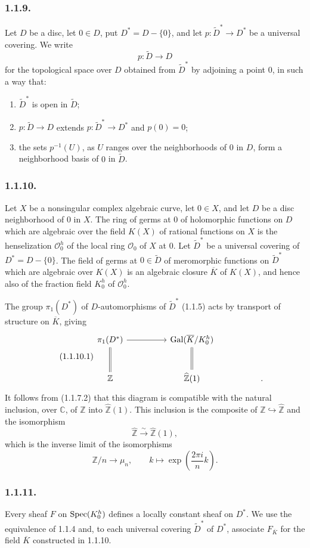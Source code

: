 \subsubsection*{1.1.9.}
Let $D$ be a disc, let $0\in D$, put $D^*=D-\{0\}$, and let
$p:\widetilde D^*\longrightarrow D^*$ be a universal covering.  We
write
\[
p:\widetilde D\longrightarrow D
\]
for the topological space over $D$ obtained from
$\widetilde D^*$ by adjoining a point $0$, in such a way that:
\begin{enumerate}[label=(\alph*),leftmargin=2.6em]
\item $\widetilde D^*$ is open in $\widetilde D$;
\item $p:\widetilde D\longrightarrow D$ extends
  $p:\widetilde D^*\longrightarrow D^*$ and $p(0)=0$;
\item the sets $p^{-1}(U)$, as $U$ ranges over the neighborhoods of
  $0$ in $D$, form a neighborhood basis of $0$ in $\widetilde D$.
\end{enumerate}

\subsubsection*{1.1.10.}
Let $X$ be a nonsingular complex algebraic curve, let $0\in X$, and
let $D$ be a disc neighborhood of $0$ in $X$.  The ring of germs at
$0$ of holomorphic functions on $D$ which are algebraic over the
field $K(X)$ of rational functions on $X$ is the henselization
$\mathcal O_0^h$ of the local ring $\mathcal O_0$ of $X$ at $0$.
Let $\widetilde D^*$ be a universal covering of
$D^*=D-\{0\}$.  The field of germs at $0\in\widetilde D$ of
meromorphic functions on $\widetilde D^*$ which are algebraic over
$K(X)$ is an algebraic closure $\overline K$ of $K(X)$, and hence
also of the fraction field $K_0^h$ of $\mathcal O_0^h$.

The group $\pi_1(D^*)$ of $D$-automorphisms of
$\widetilde D^*$ (1.1.5) acts by transport of structure on
$\overline K$, giving
\begin{equation}\tag{1.1.10.1}
\begin{tikzcd}[column sep=huge, row sep=large]
\pi_1(D^*) \arrow[r] \arrow[d, equal]
  & \operatorname{Gal}(\overline K/K_0^h) \arrow[d, equal]
  & {} \\
\mathbb Z
  & \widehat{\mathbb Z}(1)
  & .
\end{tikzcd}
\end{equation}
It follows from (1.1.7.2) that this diagram is compatible with the
natural inclusion, over $\mathbb C$, of $\mathbb Z$ into
$\widehat{\mathbb Z}(1)$.  This inclusion is the composite of
$\mathbb Z\hookrightarrow\widehat{\mathbb Z}$ and the isomorphism
\[
\widehat{\mathbb Z}\xrightarrow{\ \sim\ }
\widehat{\mathbb Z}(1),
\]
which is the inverse limit of the isomorphisms
\[
\mathbb Z/n\longrightarrow\mu_n,
\qquad
k\longmapsto\exp\left(\frac{2\pi i}{n}k\right).
\]

\subsubsection*{1.1.11.}
Every sheaf $F$ on $\operatorname{Spec}(K_0^h)$ defines a locally constant sheaf on
$D^*$.  We use the equivalence of 1.1.4 and, to each universal
covering $\widetilde D^*$ of $D^*$, associate $F_{\overline K}$ for
the field $\overline K$ constructed in 1.1.10.
